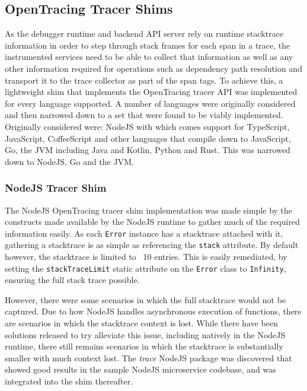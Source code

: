 \documentclass[12pt,pdftex,titlepage]{report}
\begin{document}
            \subsection{OpenTracing Tracer Shims}
                As the debugger runtime and backend API server rely on runtime stacktrace information in order to step through stack frames for each span in a trace, the instrumented services need to be able
                to collect that information as well as any other information required for operations such as dependency path resolution and transport it to the trace collector as part of the span tags.
                To achieve this, a lightweight shim that implements the OpenTracing tracer API was implemented for every language supported. A number of languages were originally considered and then narrowed
                down to a set that were found to be viably implemented. Originally considered were: NodeJS with which comes support for TypeScript, JavaScript, CoffeeScript and other languages that compile
                down to JavaScript, Go, the JVM including Java and Kotlin, Python and Rust. This was narrowed down to NodeJS, Go and the JVM.

                \subsubsection{NodeJS Tracer Shim}
                    The NodeJS OpenTracing tracer shim implementation was made simple by the constructs made available by the NodeJS runtime to gather much of the required information easily. As each \texttt{Error} 
                    instance has a stacktrace attached with it, gathering a stacktrace is as simple as referencing the \texttt{stack} attribute. By default however, the stacktrace is limited to ~10 entries. This is
                    easily remediated, by setting the \texttt{stackTraceLimit} static attribute on the \texttt{Error} class to \texttt{Infinity}, ensuring the full stack trace possible.

                    However, there were some scenarios in which the full stacktrace would not be captured. Due to how NodeJS handles asynchronous execution of functions\cite{asyncnostack}, there are scenarios in which
                    the stacktrace context is lost. While there have been solutions released to try alleviate this issue, including natively in the NodeJS runtime\cite{asyncstack}, there still remains scenarios in which
                    the stacktrace is substantially smaller with much context lost. The \textit{trace}\cite{longtrace} NodeJS package was discovered that showed good results in the sample NodeJS microservice codebase, and was
                    integrated into the shim thereafter.
\end{document}
